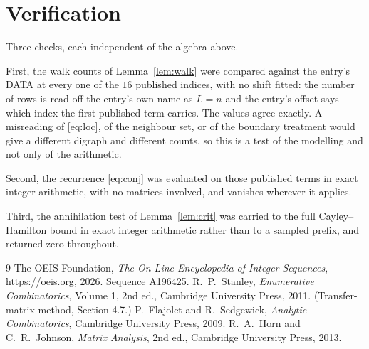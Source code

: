 \documentclass[11pt,a4paper]{article}
\theoremstyle{plain}
\theoremstyle{definition}
\begin{document}
\section{Verification}

Three checks, each independent of the algebra above.

First, the walk counts of Lemma~\ref{lem:walk} were compared against the entry's DATA at
every one of the $16$ published indices, with no shift fitted: the number of rows is
read off the entry's own name as $L=n$ and the entry's offset says which index the first
published term carries. The values agree exactly. A misreading of \eqref{eq:loc}, of the
neighbour set, or of the boundary treatment would give a different digraph and different
counts, so this is a test of the modelling and not only of the arithmetic.

Second, the recurrence \eqref{eq:conj} was evaluated on those published terms in exact
integer arithmetic, with no matrices involved, and vanishes wherever it applies.

Third, the annihilation test of Lemma~\ref{lem:crit} was carried to the full
Cayley--Hamilton bound in exact integer arithmetic rather than to a sampled prefix, and
returned zero throughout.

\begin{thebibliography}{9}
 The OEIS Foundation, \emph{The On-Line Encyclopedia of Integer
Sequences}, \url{https://oeis.org}, 2026. Sequence A196425.
 R.~P.~Stanley, \emph{Enumerative Combinatorics}, Volume 1, 2nd ed.,
Cambridge University Press, 2011. (Transfer-matrix method, Section 4.7.)
 P.~Flajolet and R.~Sedgewick, \emph{Analytic Combinatorics}, Cambridge
University Press, 2009.
 R.~A.~Horn and C.~R.~Johnson, \emph{Matrix Analysis}, 2nd ed., Cambridge
University Press, 2013.
\end{thebibliography}
\end{document}
